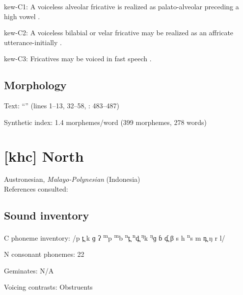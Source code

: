 {\begin{appendixdesc}
\item[kew-C1:] A voiceless alveolar fricative is realized as palato-alveolar preceding a high vowel \citep[24]{Franklin1971}.

\item[kew-C2:] A voiceless bilabial or velar fricative may be realized as an affricate utterance-initially \citep[24]{Franklin1971}.

\item[kew-C3:] Fricatives may be voiced in fast speech \citep[24]{Franklin1971}.
\end{appendixdesc}
\subsection*{Morphology}

\begin{appendixdesc}

\item[Text:] “” (lines 1--13, 32--58, \citealt{FranklinFranklin1978}: 483--487)

\item[Synthetic index:] 1.4 morphemes/word (399 morphemes, 278 words)
\end{appendixdesc}
\section*{[khc]  North}   %
Austronesian, \textit{Malayo-Polynesian} (Indonesia)\medskip\\
References consulted: \citet{Donohue1999}

\subsection*{Sound inventory}
\begin{appendixdesc}

\item[C phoneme inventory:] /p t̪ k ɡ ʔ \textsuperscript{m}p \textsuperscript{m}b \textsuperscript{n}t̪ \textsuperscript{n}d̪ \textsuperscript{ŋ}k \textsuperscript{ŋ}ɡ ɓ ɗ̪ β s h \textsuperscript{n}s m n̪ ŋ r l/

\item[N consonant phonemes:] 22

\item[Geminates:] N/A

\item[Voicing contrasts:] Obstruents


\end{appendixdesc}}
